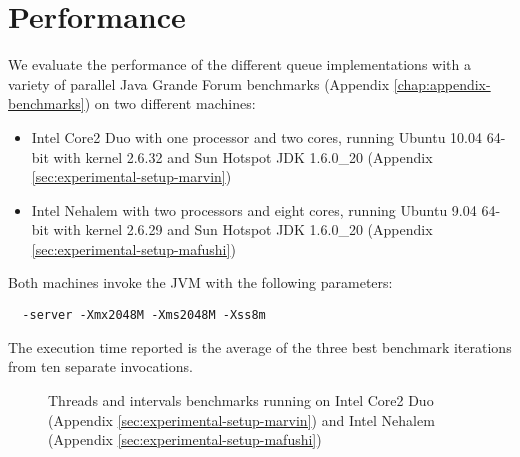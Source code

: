 
\chapter{Performance}
\label{chap:queues-performance}

We evaluate the performance of the different queue implementations
with a variety of parallel Java Grande Forum benchmarks (Appendix
\ref{chap:appendix-benchmarks}) on two different machines:

\begin{itemize}
\item Intel Core2 Duo with one processor and two cores, running Ubuntu
  10.04 64-bit with kernel 2.6.32 and Sun Hotspot JDK 1.6.0\_20
  (Appendix \ref{sec:experimental-setup-marvin})
\item Intel Nehalem with two processors and eight cores, running
  Ubuntu 9.04 64-bit with kernel 2.6.29 and Sun Hotspot JDK 1.6.0\_20
  (Appendix \ref{sec:experimental-setup-mafushi})
\end{itemize}

Both machines invoke the JVM with the following parameters:

\begin{lstlisting}
  -server -Xmx2048M -Xms2048M -Xss8m
\end{lstlisting}

The execution time reported is the average of the three best benchmark
iterations from ten separate invocations.

\begin{figure}[ht]
  \centering
  \caption{Threads and intervals benchmarks running on Intel Core2 Duo
    (Appendix \ref{sec:experimental-setup-marvin}) and Intel
    Nehalem (Appendix \ref{sec:experimental-setup-mafushi})}
  \label{fig:queues-evaluation-threads}
\end{figure}



